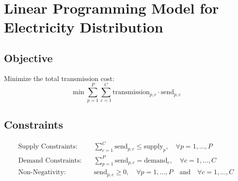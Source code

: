 \documentclass{article}
\begin{document}
\section*{Linear Programming Model for Electricity Distribution}

\subsection*{Objective}
Minimize the total transmission cost:
\begin{equation}
\min \sum_{p=1}^P \sum_{c=1}^C \text{transmission}_{p,c} \cdot \text{send}_{p,c}
\end{equation}

\subsection*{Constraints}
\begin{align}
\text{Supply Constraints:} \quad & \sum_{c=1}^C \text{send}_{p,c} \leq \text{supply}_{p}, \quad \forall p = 1, \ldots, P \\
\text{Demand Constraints:} \quad & \sum_{p=1}^P \text{send}_{p,c} = \text{demand}_{c}, \quad \forall c = 1, \ldots, C \\
\text{Non-Negativity:} \quad & \text{send}_{p,c} \geq 0, \quad \forall p = 1, \ldots, P \quad \text{and} \quad \forall c = 1, \ldots, C
\end{align}
\end{document}
